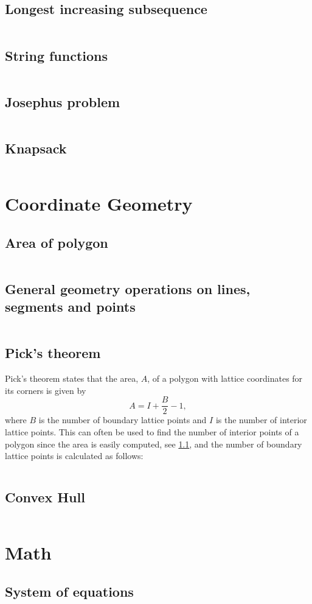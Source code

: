 \documentclass[8pt,a4paper,landscape,oneside]{amsart}
\newcommand{\codep}[1]{\inputminted[fontsize=\large,tabsize=2,baselinestretch=1]{py}{code/#1}}
\begin{document}
\begin{multicols*}{2}
\begin{large}
\subsection{Longest increasing subsequence}
\codep{lis.py}
\subsection{String functions}
\codep{stringmatching.py}
\subsection{Josephus problem}
\codep{josephus.py}
\subsection{Knapsack}
\codep{knapsack.py}
\section{Coordinate Geometry}
\subsection{Area of polygon}\label{sec: polyarea}
\codep{polygonArea.py}
\subsection{General geometry operations on lines, segments and points}
\codep{geometry.py}
\subsection{Pick's theorem}
Pick's theorem states that the area, $A$, of a polygon with lattice coordinates for its corners is given by $$A=I+\frac{B}{2}-1,$$ where $B$ is the number of boundary lattice points and $I$ is the number of interior lattice points. This can often be used to find the number of interior points of a polygon since the area is easily computed, see \ref{sec: polyarea}, and the number of boundary lattice points is calculated as follows:
\codep{boundarypoints.py}
\subsection{Convex Hull}
\codep{convexhull.py}
\section{Math}
\subsection{System of equations}
\codep{gaussianelimination.py}

\end{large}
\end{multicols*}
\end{document}
